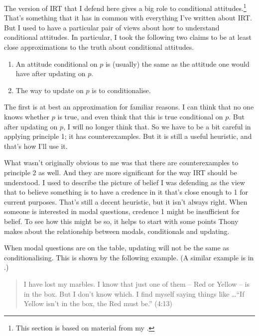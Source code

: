 \documentclass[11pt,]{book}
\providecommand{\tightlist}{%
  \setlength{\itemsep}{0pt}\setlength{\parskip}{0pt}}
\let\rmarkdownfootnote\footnote%
\def\footnote{\protect\rmarkdownfootnote}
\begin{document}
The version of IRT that I defend here gives a big role to conditional attitudes.\footnote{This section is based on material from my \citeyearpar[sect. 1]{Weatherson2016}.} That's something that it has in common with everything I've written about IRT. But I used to have a particular pair of views about how to understand conditional attitudes. In particular, I took the following two claims to be at least close approximations to the truth about conditional attitudes.

\begin{enumerate}
\def\labelenumi{\arabic{enumi}.}
\tightlist
\item
  An attitude conditional on \(p\) is (usually) the same as the attitude one would have after updating on \(p\).
\item
  The way to update on \(p\) is to conditionalise.
\end{enumerate}

The first is at best an approximation for familiar reasons. I can think that no one knows whether \(p\) is true, and even think that this is true conditional on \(p\). But after updating on \(p\), I will no longer think that. So we have to be a bit careful in applying principle 1; it has counterexamples. But it is still a useful heuristic, and that's how I'll use it.

What wasn't originally obvious to me was that there are counterexamples to principle 2 as well. And they are more significant for the way IRT should be understood. I used to describe the picture of belief I was defending as the view that to believe something is to have a credence in it that's close enough to 1 for current purposes. That's still a decent heuristic, but it isn't always right. When someone is interested in modal questions, credence 1 might be insufficient for belief. To see how this might be so, it helps to start with some points Thony \citet{Gillies2010} makes about the relationship between modals, conditionals and updating.

When modal questions are on the table, updating will not be the same as conditionalising. This is shown by the following example. (A similar example is in \citet[94]{Kratzer2012}.)

\begin{quote}
I have lost my marbles. I know that just one of them -- Red or Yellow -- is in the box. But I don't know which. I find myself saying things like \ldots{}``If Yellow isn't in the box, the Red must be.'' (4:13)
\end{quote}
\end{document}
